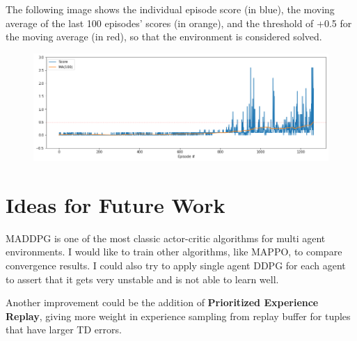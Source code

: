 \documentclass{article}
\begin{document}
The following image shows the individual episode score (in blue), the moving average of the last 100 episodes' scores (in orange), and the threshold of +0.5 for the moving average (in red), so that the environment is considered solved.

\begin{figure}[H]
\centering
\centering
\includegraphics[scale=0.475]{img/score.png}
\label{fig:score}
\end{figure}

\section{Ideas for Future Work}

MADDPG is one of the most classic actor-critic algorithms for multi agent environments. I would like to train other algorithms, like MAPPO, to compare convergence results. I could also try to apply single agent DDPG for each agent to assert that it gets very unstable and is not able to learn well.

Another improvement could be the addition of \textbf{Prioritized Experience Replay}, giving more weight in experience sampling from replay buffer for tuples that have larger TD errors.



\end{document}
